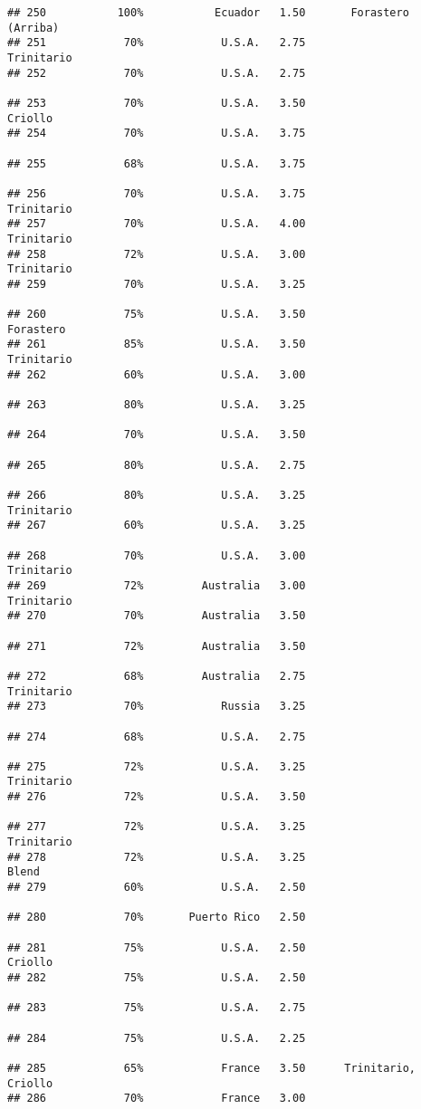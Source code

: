 \documentclass[
]{article}
\begin{document}
\begin{verbatim}
## 250           100%           Ecuador   1.50       Forastero (Arriba)
## 251            70%            U.S.A.   2.75               Trinitario
## 252            70%            U.S.A.   2.75                         
## 253            70%            U.S.A.   3.50                  Criollo
## 254            70%            U.S.A.   3.75                         
## 255            68%            U.S.A.   3.75                         
## 256            70%            U.S.A.   3.75               Trinitario
## 257            70%            U.S.A.   4.00               Trinitario
## 258            72%            U.S.A.   3.00               Trinitario
## 259            70%            U.S.A.   3.25                         
## 260            75%            U.S.A.   3.50                Forastero
## 261            85%            U.S.A.   3.50               Trinitario
## 262            60%            U.S.A.   3.00                         
## 263            80%            U.S.A.   3.25                         
## 264            70%            U.S.A.   3.50                         
## 265            80%            U.S.A.   2.75                         
## 266            80%            U.S.A.   3.25               Trinitario
## 267            60%            U.S.A.   3.25                         
## 268            70%            U.S.A.   3.00               Trinitario
## 269            72%         Australia   3.00               Trinitario
## 270            70%         Australia   3.50                         
## 271            72%         Australia   3.50                         
## 272            68%         Australia   2.75               Trinitario
## 273            70%            Russia   3.25                         
## 274            68%            U.S.A.   2.75                         
## 275            72%            U.S.A.   3.25               Trinitario
## 276            72%            U.S.A.   3.50                         
## 277            72%            U.S.A.   3.25               Trinitario
## 278            72%            U.S.A.   3.25                    Blend
## 279            60%            U.S.A.   2.50                         
## 280            70%       Puerto Rico   2.50                         
## 281            75%            U.S.A.   2.50                  Criollo
## 282            75%            U.S.A.   2.50                         
## 283            75%            U.S.A.   2.75                         
## 284            75%            U.S.A.   2.25                         
## 285            65%            France   3.50      Trinitario, Criollo
## 286            70%            France   3.00                         

\end{verbatim}
\end{document}

